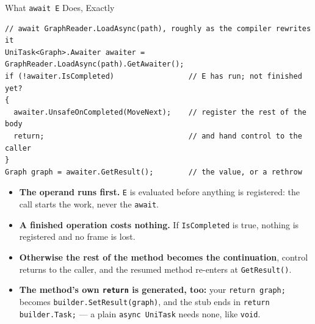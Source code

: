 \begin{frame}[fragile]{What \texttt{await E} Does, Exactly}
  \begin{lstlisting}[basicstyle=\scriptsize\ttfamily]
// await GraphReader.LoadAsync(path), roughly as the compiler rewrites it
UniTask<Graph>.Awaiter awaiter = GraphReader.LoadAsync(path).GetAwaiter();
if (!awaiter.IsCompleted)                 // E has run; not finished yet?
{
  awaiter.UnsafeOnCompleted(MoveNext);    // register the rest of the body
  return;                                 // and hand control to the caller
}
Graph graph = awaiter.GetResult();        // the value, or a rethrow
  \end{lstlisting}
  \vspace{0.5ex}

  \begin{itemize}
    \item \textbf{The operand runs first.} \texttt{E} is evaluated before
      anything is registered: the call starts the work, never the
      \texttt{await}.
    \item \textbf{A finished operation costs nothing.} If \texttt{IsCompleted}
      is true, nothing is registered and no frame is lost.
    \item \textbf{Otherwise the rest of the method becomes the continuation},
      control returns to the caller, and the resumed method re-enters at
      \texttt{GetResult()}.
    \item \textbf{The method's own \texttt{return} is generated, too:} your
      \texttt{return graph;} becomes \texttt{builder.SetResult(graph)}, and the
      stub ends in \texttt{return builder.Task;} --- a plain
      \texttt{async UniTask} needs none, like \texttt{void}.
  \end{itemize}
\end{frame}

